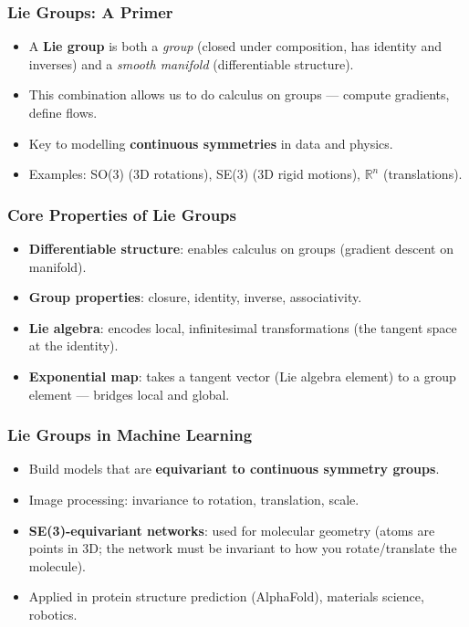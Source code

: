 \begin{frame}[fragile]\frametitle{Lie Groups: A Primer}
  \begin{itemize}
    \item A \textbf{Lie group} is both a \emph{group} (closed under composition, has identity and inverses) and a \emph{smooth manifold} (differentiable structure).
    \item This combination allows us to do calculus on groups --- compute gradients, define flows.
    \item Key to modelling \textbf{continuous symmetries} in data and physics.
    \item Examples: SO(3) (3D rotations), SE(3) (3D rigid motions), $\mathbb{R}^n$ (translations).
  \end{itemize}
\end{frame}

\begin{frame}[fragile]\frametitle{Core Properties of Lie Groups}
  \begin{itemize}
    \item \textbf{Differentiable structure}: enables calculus on groups (gradient descent on manifold).
    \item \textbf{Group properties}: closure, identity, inverse, associativity.
    \item \textbf{Lie algebra}: encodes local, infinitesimal transformations (the tangent space at the identity).
    \item \textbf{Exponential map}: takes a tangent vector (Lie algebra element) to a group element --- bridges local and global.
  \end{itemize}
\end{frame}

\begin{frame}[fragile]\frametitle{Lie Groups in Machine Learning}
  \begin{itemize}
    \item Build models that are \textbf{equivariant to continuous symmetry groups}.
    \item Image processing: invariance to rotation, translation, scale.
    \item \textbf{SE(3)-equivariant networks}: used for molecular geometry (atoms are points in 3D; the network must be invariant to how you rotate/translate the molecule).
    \item Applied in protein structure prediction (AlphaFold), materials science, robotics.
  \end{itemize}
\end{frame}

